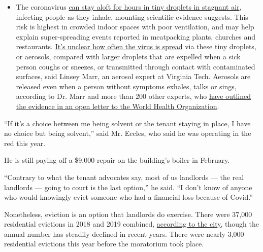 \begin{itemize}
  \begin{itemize}
  \tightlist
  \item
    The coronavirus
    \href{https://www.nytimes.com/2020/07/04/health/239-experts-with-one-big-claim-the-coronavirus-is-airborne.html?action=click\&pgtype=Article\&state=default\&region=MAIN_CONTENT_3\&context=storylines_faq}{can
    stay aloft for hours in tiny droplets in stagnant air}, infecting
    people as they inhale, mounting scientific evidence suggests. This
    risk is highest in crowded indoor spaces with poor ventilation, and
    may help explain super-spreading events reported in meatpacking
    plants, churches and restaurants.
    \href{https://www.nytimes.com/2020/07/06/health/coronavirus-airborne-aerosols.html?action=click\&pgtype=Article\&state=default\&region=MAIN_CONTENT_3\&context=storylines_faq}{It's
    unclear how often the virus is spread} via these tiny droplets, or
    aerosols, compared with larger droplets that are expelled when a
    sick person coughs or sneezes, or transmitted through contact with
    contaminated surfaces, said Linsey Marr, an aerosol expert at
    Virginia Tech. Aerosols are released even when a person without
    symptoms exhales, talks or sings, according to Dr. Marr and more
    than 200 other experts, who
    \href{https://academic.oup.com/cid/article/doi/10.1093/cid/ciaa939/5867798}{have
    outlined the evidence in an open letter to the World Health
    Organization}.
  \end{itemize}
\end{itemize}

``If it's a choice between me being solvent or the tenant staying in
place, I have no choice but being solvent,'' said Mr. Eccles, who said
he was operating in the red this year.

He is still paying off a \$9,000 repair on the building's boiler in
February.

``Contrary to what the tenant advocates say, most of us landlords ---
the real landlords --- going to court is the last option,'' he said. ``I
don't know of anyone who would knowingly evict someone who had a
financial loss because of Covid.''

Nonetheless, eviction is an option that landlords do exercise. There
were 37,000 residential evictions in 2018 and 2019 combined,
\href{https://www1.nyc.gov/assets/hra/downloads/pdf/services/civiljustice/OCJ_Annual_Report_2019.pdf}{according
to the city}, though the annual number has steadily declined in recent
years. There were nearly 3,000 residential evictions this year before
the moratorium took place.

